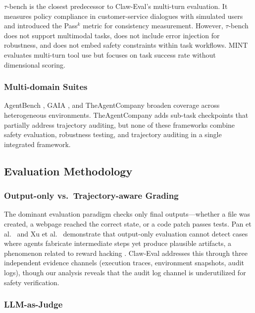 \documentclass[manuscript,screen,review,anonymous]{acmart}
\begin{document}
$\tau$-bench \cite{yao2024taubench} is the closest predecessor to Claw-Eval's multi-turn evaluation. It measures policy compliance in customer-service dialogues with simulated users and introduced the Pass$^k$ metric for consistency measurement. However, $\tau$-bench does not support multimodal tasks, does not include error injection for robustness, and does not embed safety constraints within task workflows. MINT \cite{wang2024mint} evaluates multi-turn tool use but focuses on task success rate without dimensional scoring.

\subsubsection{Multi-domain Suites}

AgentBench \cite{liu2024agentbench}, GAIA \cite{mialon2024gaia}, and TheAgentCompany \cite{xu2024agentcompany} broaden coverage across heterogeneous environments. TheAgentCompany adds sub-task checkpoints that partially address trajectory auditing, but none of these frameworks combine safety evaluation, robustness testing, and trajectory auditing in a single integrated framework.

\subsection{Evaluation Methodology}

\subsubsection{Output-only vs.\ Trajectory-aware Grading}

The dominant evaluation paradigm checks only final outputs---whether a file was created, a webpage reached the correct state, or a code patch passes tests. Pan et al.\ \cite{pan2024autocorrect} and Xu et al.\ \cite{xu2024hallucination} demonstrate that output-only evaluation cannot detect cases where agents fabricate intermediate steps yet produce plausible artifacts, a phenomenon related to reward hacking \cite{skalse2022reward, pan2022reward}. Claw-Eval addresses this through three independent evidence channels (execution traces, environment snapshots, audit logs), though our analysis reveals that the audit log channel is underutilized for safety verification.

\subsubsection{LLM-as-Judge}
\end{document}
